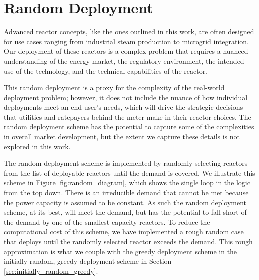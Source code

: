 \section{Random Deployment}
\label{sec:random_deployment}

Advanced reactor concepts, like the ones outlined in this work, are often
designed for use cases ranging from industrial steam production to microgrid
integration. Our deployment of these reactors is
a complex problem that requires a nuanced understanding of the energy market,
the regulatory environment, the intended use of the technology, and the
technical capabilities of the reactor.

This random deployment is a proxy for the complexity of the real-world
deployment problem; however, it does not include the nuance of how individual
deployments meet an end user's needs, which will drive the strategic decisions
that utilities and ratepayers behind the meter make in their reactor choices.
The random deployment scheme has the potential to capture some of the
complexities in overall market development, but the extent we capture these
details is not explored in this work.

The random deployment scheme is implemented by randomly selecting reactors from
the list of deployable reactors until the demand is covered. We illustrate this
scheme in Figure \ref{fig:random_diagram}, which shows the single loop in the
logic from the top down. There is an irreducible demand that cannot be met
because the power capacity is assumed to be constant. As such the random
deployment scheme, at its best, will meet the demand, but has the potential to
fall short of the demand by one of the smallest capacity reactors. To reduce
the computational cost of this scheme, we have implemented a rough random case
that deploys until the randomly selected reactor exceeds the demand. This rough
approximation is what we couple with the greedy deployment scheme in the
initially random, greedy deployment scheme in Section
\ref{sec:initially_random_greedy}.

